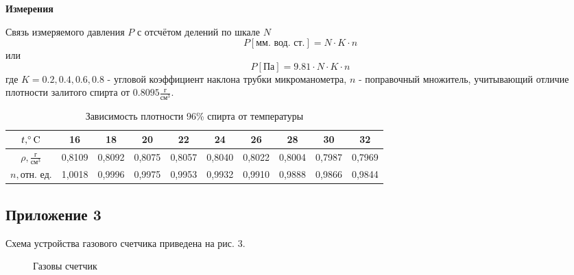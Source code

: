 \textbf{Измерения}

Связь измеряемого давления $P$ с отсчётом делений по шкале $N$
\[ P[\text{мм. вод. ст.}] = N\cdot K\cdot n\]
или
\[P[\text{Па}] = 9.81\cdot N\cdot K\cdot n\]
где $K = 0.2, 0.4, 0.6, 0.8$ - угловой коэффициент наклона трубки микроманометра, $n$ - поправочный множитель, учитывающий отличие плотности залитого спирта от $0.8095\frac{\text{г}}{\text{см}^3}$.
\begin{table}[h]
    \centering
    \begin{tabular}{|c|c|c|c|c|c|c|c|c|c|}
    \hline
    $t, \celsius$ & 16 & 18 & 20 & 22 & 24 & 26 & 28 & 30 &32 \\ \hline
     $\rho, \frac{\text{г}}{\text{см}^3}$ & 0,8109  & 0,8092   & 0,8075   & 0,8057   & 0,8040 & 0,8022 & 0,8004 & 0,7987 & 0,7969 \\ \hline
     $n, \text{отн. ед.}$ & 1,0018 & 0,9996 & 0,9975 & 0,9953 & 0,9932 & 0,9910 & 0,9888 & 0,9866 & 0,9844 \\ \hline
     
\end{tabular}
    \caption{Зависимость плотности 96\% спирта от температуры}
    \label{tab:t1}
\end{table}

\subsection{Приложение 3} \label{Приложение 3}
Схема устройства газового счетчика приведена на рис. 3.
\begin{figure}[ht]
    \label{figure3}
    \caption{Газовы счетчик}
\end{figure}

